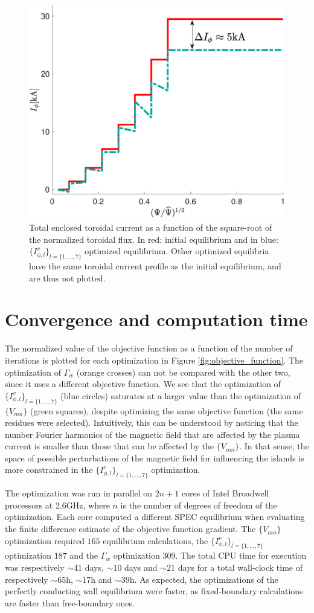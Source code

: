 \documentclass[my_thesis.tex]{subfiles}
\begin{document}
\begin{figure}
    \centering
    \includegraphics[width=.45\textwidth]{main/Figures_Optimization/CurrentProfiles.pdf}
    \caption{Total enclosed toroidal current as a function of the square-root of the normalized toroidal flux. In red: initial equilibrium and in blue: $\{I^v_{\phi,l}\}_{l=\{1,\ldots,7\}}$ optimized equilibrium. Other optimized equilibria have the same toroidal current profile as the initial equilibrium, and are thus not plotted. }
    \label{fig:Iprofile}
\end{figure}





\section{Convergence and computation time}

The normalized value of the objective function as a function of the number of iterations is plotted for each optimization in Figure \ref{fig:objective_function}. The optimization of $\Gamma_w$ (orange crosses) can not be compared with the other two, since it uses a different objective function. We see that the optimization of $\{I^v_{\phi,l}\}_{l=\{1,\ldots,7\}}$ (blue circles) saturates at a larger value than the optimization of $\{V_{mn}\}$ (green squares), despite optimizing the same objective function (the same residues were selected). Intuitively, this can be understood by noticing that the number Fourier harmonics of the magnetic field that are affected by the plasma current is smaller than those that can be affected by the $\{V_{mn}\}$. In that sense, the space of possible perturbations of the magnetic field for influencing the islands is more constrained in the $\{I^v_{\phi,l}\}_{l=\{1,\ldots,7\}}$ optimization.

The optimization was run in parallel on $2n+1$ cores of Intel Broadwell processors at 2.6GHz, where $n$ is the number of degrees of freedom of the optimization. Each core computed a different SPEC equilibrium when evaluating the finite difference estimate of the objective function gradient. The $\{V_{mn}\}$ optimization required $165$ equilibrium calculations, the $\{I^v_{\phi,l}\}_{l=\{1,\ldots,7\}}$ optimization  $187$ and the $\Gamma_w$ optimization $309$. The total CPU time for execution was respectively $\sim41$ days, $\sim10$ days and $\sim21$ days for a total wall-clock time of respectively $\sim 65$h, $\sim 17$h and $\sim 39$h. As expected, the optimizations of the perfectly conducting wall equilibrium were faster, as fixed-boundary calculations are faster than free-boundary ones. 
\end{document}
